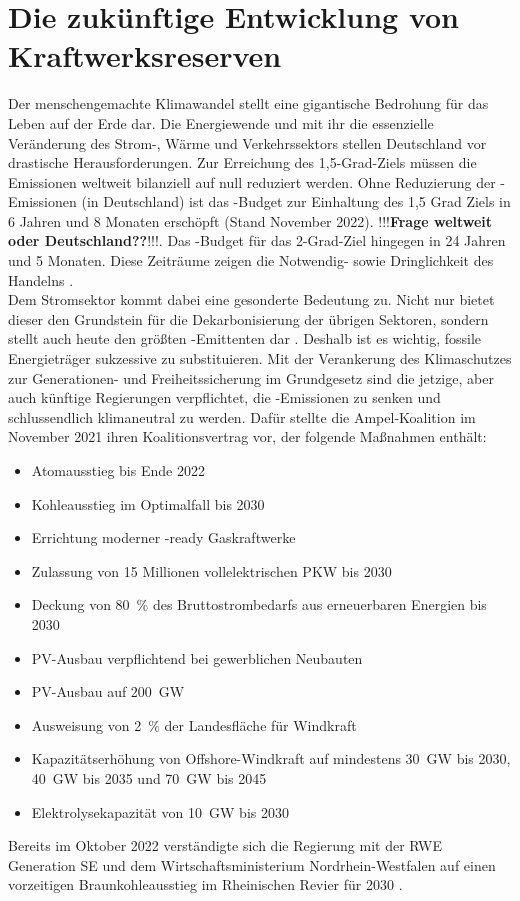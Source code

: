 		
\section{Die zukünftige Entwicklung von Kraftwerksreserven}
		
	Der menschengemachte Klimawandel stellt eine gigantische Bedrohung für das Leben auf der Erde dar. 
	Die Energiewende und mit ihr die essenzielle Veränderung des Strom-, Wärme und Verkehrssektors stellen Deutschland vor drastische Herausforderungen. 
	Zur Erreichung des 1,5-Grad-Ziels müssen die Emissionen weltweit bilanziell auf null reduziert werden.
	Ohne Reduzierung der \COO-Emissionen (in Deutschland) ist das \COO-Budget zur Einhaltung des 1,5 Grad Ziels in 6 Jahren und 8 Monaten erschöpft (Stand November 2022). !!!\textbf{Frage weltweit oder Deutschland??}!!!.
	Das \COO-Budget für das 2-Grad-Ziel hingegen in 24 Jahren und 5 Monaten. 
	Diese Zeiträume zeigen die Notwendig- sowie Dringlichkeit des Handelns \cite{CO2_Uhr}. \\ 
	
	Dem Stromsektor kommt dabei eine gesonderte Bedeutung zu. 
	Nicht nur bietet dieser den Grundstein für die Dekarbonisierung der übrigen Sektoren, sondern stellt auch heute den größten \COO-Emittenten dar \cite{Umweltbundesamt_Emissionen}. 
	Deshalb ist es wichtig, fossile Energieträger sukzessive zu substituieren. 
	Mit der Verankerung des Klimaschutzes zur Generationen- und Freiheitssicherung im Grundgesetz sind die jetzige, aber auch künftige Regierungen verpflichtet, die \COO-Emissionen zu senken und schlussendlich klimaneutral zu werden. 
	Dafür stellte die Ampel-Koalition im November 2021 ihren Koalitionsvertrag vor, der folgende Maßnahmen enthält\cite{Koalitionsvertrag}:
	\begin{itemize}
		\item Atomausstieg bis Ende 2022
		\item Kohleausstieg im Optimalfall bis 2030
		\item Errichtung moderner \Htwo-ready Gaskraftwerke
		\item Zulassung von 15 Millionen vollelektrischen PKW bis 2030
		\item Deckung von \SI{80}{\percent} des Bruttostrombedarfs aus erneuerbaren Energien bis 2030
		\item PV-Ausbau verpflichtend bei gewerblichen Neubauten
		\item PV-Ausbau auf \SI{200}{\giga\watt}
		\item Ausweisung von \SI{2}{\percent} der Landesfläche für Windkraft
		\item Kapazitätserhöhung von Offshore-Windkraft auf mindestens \SI{30}{\giga\watt} bis 2030, \SI{40}{\giga\watt} bis 2035 und \SI{70}{\giga\watt} bis 2045
		\item Elektrolysekapazität von \SI{10}{\giga\watt} bis 2030
	\end{itemize}
	Bereits im Oktober 2022 verständigte sich die Regierung mit der RWE Generation SE und dem Wirtschaftsministerium Nordrhein-Westfalen auf einen vorzeitigen Braunkohleausstieg im Rheinischen Revier für 2030 \cite{Kohleausstieg_RWE}. \\
	
